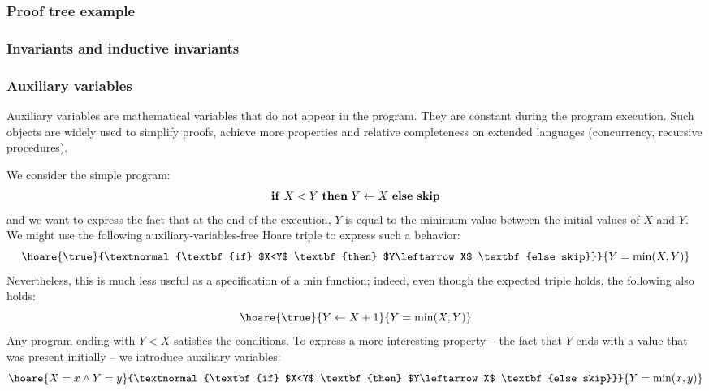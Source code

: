 \documentclass[toc]{../cs-classes/cs-classes}
\begin{document}
\subsubsection{Proof tree example}

\subsubsection{Invariants and inductive invariants}

\subsubsection{Auxiliary variables}
Auxiliary variables are mathematical variables that do not appear in the program. They are constant during the program execution. Such objects are widely used to simplify proofs, achieve more properties and relative completeness on extended languages (concurrency, recursive procedures). 

\begin{example}
    We consider the simple program:
    \begin{equation*}
        \textnormal{\textbf{if} $X<Y$ \textbf{then} $Y\leftarrow X$ \textbf{else skip}}
    \end{equation*}
    and we want to express the fact that at the end of the execution, $Y$ is equal to the minimum value between the initial values of $X$ and $Y$. We might use the following auxiliary-variables-free Hoare triple to express such a behavior:
    \begin{equation*}
        \hoare{\true}{\textnormal{\textbf{if} $X<Y$ \textbf{then} $Y\leftarrow X$ \textbf{else skip}}}{Y=\min(X, Y)}
    \end{equation*}
    Nevertheless, this is much less useful as a specification of a min function; indeed, even though the expected triple holds, the following also holds:
    \begin{equation*}
        \hoare{\true}{Y\leftarrow X+1}{Y=\min(X, Y)}
    \end{equation*}
    Any program ending with $Y<X$ satisfies the conditions. To express a more interesting property -- the fact that $Y$ ends with a value that was present initially -- we introduce auxiliary variables:
    \begin{equation*}
        \hoare{X=x\land Y=y}{\textnormal{\textbf{if} $X<Y$ \textbf{then} $Y\leftarrow X$ \textbf{else skip}}}{Y=\min(x, y)}
    \end{equation*}
\end{example}
\end{document}
